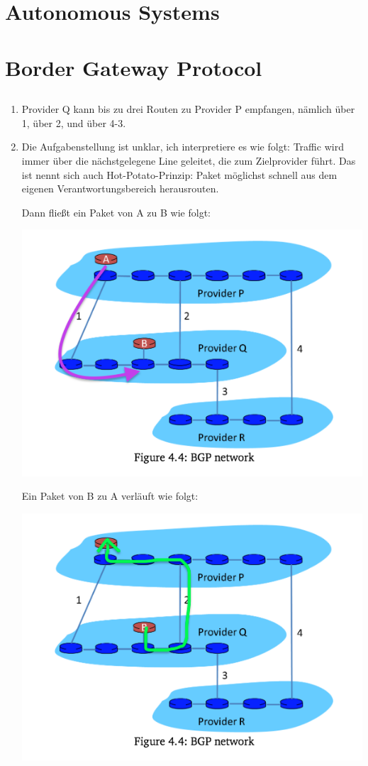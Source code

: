 \documentclass[a4paper,
			llpt,
			solution,
			accentcolor=tud2d,
			colorbacktitle
			]
			{tudexercise}
\newcommand{\8}{$\infty$}
\begin{document}
\section{Autonomous Systems}
\section{Border Gateway Protocol}
\subsection{}
\begin{enumerate}
\item Provider Q kann bis zu drei Routen zu Provider P empfangen, nämlich über 1, über 2, und über 4-3.
\item Die Aufgabenstellung ist unklar, ich interpretiere es wie folgt: Traffic wird immer über die nächstgelegene Line geleitet, die zum Zielprovider führt. Das ist nennt sich auch Hot-Potato-Prinzip: Paket möglichst schnell aus dem eigenen Verantwortungsbereich herausrouten.

\begin{multicols}{2}
Dann fließt ein Paket von A zu B wie folgt:

\includegraphics[scale=0.4]{4_3_1_b_AB.png}

Ein Paket von B zu A verläuft wie folgt:

\includegraphics[scale=0.4]{4_3_1_b_BA.png}
\end{multicols}
\end{enumerate}
\end{document}
